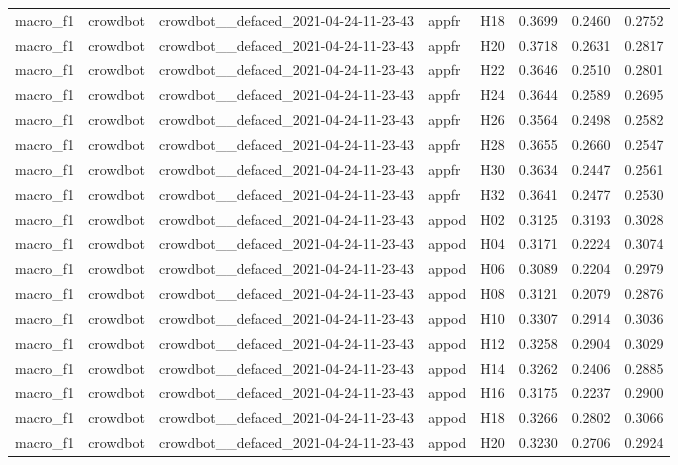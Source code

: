 \begin{table}[tbp]
\begin{tabular}{lllllrrr}
macro\_f1 & crowdbot & crowdbot\_\_defaced\_2021-04-24-11-23-43 & appfr & H18 & 0.3699 & 0.2460 & 0.2752 \\
macro\_f1 & crowdbot & crowdbot\_\_defaced\_2021-04-24-11-23-43 & appfr & H20 & 0.3718 & 0.2631 & 0.2817 \\
macro\_f1 & crowdbot & crowdbot\_\_defaced\_2021-04-24-11-23-43 & appfr & H22 & 0.3646 & 0.2510 & 0.2801 \\
macro\_f1 & crowdbot & crowdbot\_\_defaced\_2021-04-24-11-23-43 & appfr & H24 & 0.3644 & 0.2589 & 0.2695 \\
macro\_f1 & crowdbot & crowdbot\_\_defaced\_2021-04-24-11-23-43 & appfr & H26 & 0.3564 & 0.2498 & 0.2582 \\
macro\_f1 & crowdbot & crowdbot\_\_defaced\_2021-04-24-11-23-43 & appfr & H28 & 0.3655 & 0.2660 & 0.2547 \\
macro\_f1 & crowdbot & crowdbot\_\_defaced\_2021-04-24-11-23-43 & appfr & H30 & 0.3634 & 0.2447 & 0.2561 \\
macro\_f1 & crowdbot & crowdbot\_\_defaced\_2021-04-24-11-23-43 & appfr & H32 & 0.3641 & 0.2477 & 0.2530 \\
macro\_f1 & crowdbot & crowdbot\_\_defaced\_2021-04-24-11-23-43 & appod & H02 & 0.3125 & 0.3193 & 0.3028 \\
macro\_f1 & crowdbot & crowdbot\_\_defaced\_2021-04-24-11-23-43 & appod & H04 & 0.3171 & 0.2224 & 0.3074 \\
macro\_f1 & crowdbot & crowdbot\_\_defaced\_2021-04-24-11-23-43 & appod & H06 & 0.3089 & 0.2204 & 0.2979 \\
macro\_f1 & crowdbot & crowdbot\_\_defaced\_2021-04-24-11-23-43 & appod & H08 & 0.3121 & 0.2079 & 0.2876 \\
macro\_f1 & crowdbot & crowdbot\_\_defaced\_2021-04-24-11-23-43 & appod & H10 & 0.3307 & 0.2914 & 0.3036 \\
macro\_f1 & crowdbot & crowdbot\_\_defaced\_2021-04-24-11-23-43 & appod & H12 & 0.3258 & 0.2904 & 0.3029 \\
macro\_f1 & crowdbot & crowdbot\_\_defaced\_2021-04-24-11-23-43 & appod & H14 & 0.3262 & 0.2406 & 0.2885 \\
macro\_f1 & crowdbot & crowdbot\_\_defaced\_2021-04-24-11-23-43 & appod & H16 & 0.3175 & 0.2237 & 0.2900 \\
macro\_f1 & crowdbot & crowdbot\_\_defaced\_2021-04-24-11-23-43 & appod & H18 & 0.3266 & 0.2802 & 0.3066 \\
macro\_f1 & crowdbot & crowdbot\_\_defaced\_2021-04-24-11-23-43 & appod & H20 & 0.3230 & 0.2706 & 0.2924 \\

\end{tabular}
\end{table}
